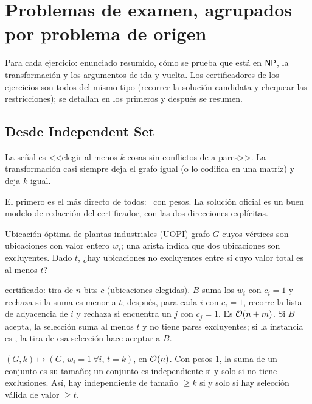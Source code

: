 \section{Problemas de examen, agrupados por problema de origen}

Para cada ejercicio: enunciado resumido, cómo se prueba que está en $\mathsf{NP}$, la transformación y los argumentos de ida y vuelta. Los certificadores de los ejercicios son todos del mismo tipo (recorrer la solución candidata y chequear las restricciones); se detallan en los primeros y después se resumen.

\subsection{Desde Independent Set}

La señal es <<elegir al menos $k$ cosas sin conflictos de a pares>>. La transformación casi siempre deja el grafo igual (o lo codifica en una matriz) y deja $k$ igual.

El primero es el más directo de todos: \npIS\ con pesos. La solución oficial es un buen modelo de redacción del certificador, con las dos direcciones explícitas.

\begin{problema}{Ubicación óptima de plantas industriales (UOPI)}
 grafo $G$ cuyos vértices son ubicaciones con valor entero $w_i$; una arista indica que dos ubicaciones son excluyentes. Dado $t$, ¿hay ubicaciones no excluyentes entre sí cuyo valor total es al menos $t$?

 certificado: tira de $n$ bits $c$ (ubicaciones elegidas). $B$ suma los $w_i$ con $c_i=1$ y rechaza si la suma es menor a $t$; después, para cada $i$ con $c_i=1$, recorre la lista de adyacencia de $i$ y rechaza si encuentra un $j$ con $c_j=1$. Es $\mathcal{O}(n+m)$. Si $B$ acepta, la selección suma al menos $t$ y no tiene pares excluyentes; si la instancia es \npsi, la tira de esa selección hace aceptar a $B$.

 $(G,k)\mapsto(G,\,w_i=1\ \forall i,\,t=k)$, en $\mathcal{O}(n)$. Con pesos 1, la suma de un conjunto es su tamaño; un conjunto es independiente si y solo si no tiene exclusiones. Así, hay independiente de tamaño $\ge k$ si y solo si hay selección válida de valor $\ge t$.
\end{problema}

